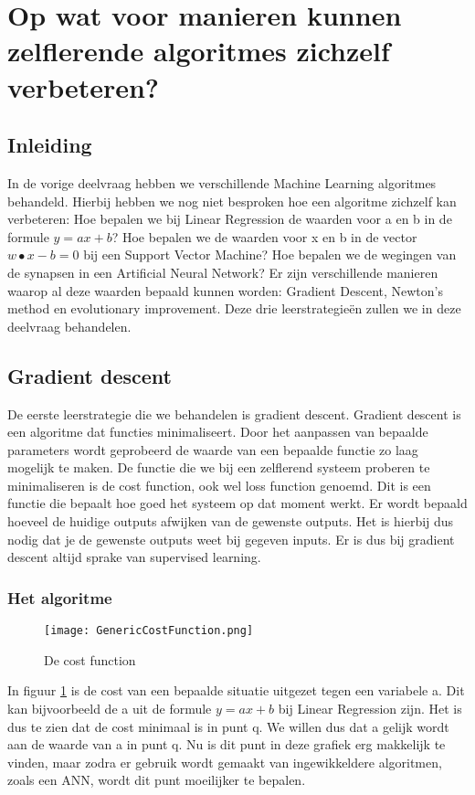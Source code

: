 \section{Op wat voor manieren kunnen zelflerende algoritmes zichzelf verbeteren?}

\subsection{Inleiding}
In de vorige deelvraag hebben we verschillende Machine Learning algoritmes behandeld. Hierbij hebben we nog niet besproken hoe een algoritme zichzelf kan verbeteren: Hoe bepalen we bij Linear Regression de waarden voor a en b in de formule $ y = ax + b $? Hoe bepalen we de waarden voor  x en b in de vector $ w ∙ x - b = 0 $ bij een Support Vector Machine? Hoe bepalen we de wegingen van de synapsen in een Artificial Neural Network? Er zijn verschillende manieren waarop al deze waarden bepaald kunnen worden: Gradient Descent, Newton's method en evolutionary improvement. Deze drie leerstrategieën zullen we in deze deelvraag behandelen.

\subsection{Gradient descent}
De eerste leerstrategie die we behandelen is gradient descent. Gradient descent is een algoritme dat functies minimaliseert. Door het aanpassen van bepaalde parameters wordt geprobeerd de waarde van een bepaalde functie zo laag mogelijk te maken. De functie die we bij een zelflerend systeem proberen te minimaliseren is de cost function, ook wel loss function genoemd. Dit is een functie die bepaalt hoe goed het systeem op dat moment werkt. Er wordt bepaald hoeveel de huidige outputs afwijken van de gewenste outputs. Het is hierbij dus nodig dat je de gewenste outputs weet bij gegeven inputs. Er is dus bij gradient descent altijd sprake van supervised learning. 

\subsubsection{Het algoritme} 
\begin{figure}[h]
  \centering
    \texttt{[image: GenericCostFunction.png]}
  \caption{De cost function}
  \label{fig:GenericCostFunction}
\end{figure}

In figuur \ref{fig:GenericCostFunction} is de cost van een bepaalde situatie uitgezet tegen een variabele a. Dit kan bijvoorbeeld de a uit de formule $ y = ax + b $ bij Linear Regression zijn.  Het is dus te zien dat de cost minimaal is in punt q. We willen dus dat a gelijk wordt aan de waarde van a in punt q. Nu is dit punt in deze grafiek erg makkelijk te vinden, maar zodra er gebruik wordt gemaakt van ingewikkeldere algoritmen, zoals een ANN, wordt dit punt moeilijker te bepalen.

